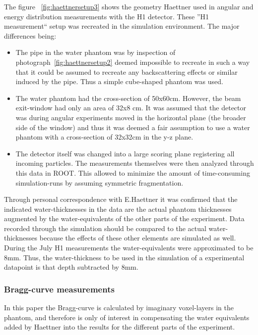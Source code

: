 The figure ~\ref{fig:haettnersetup3} shows the geometry Haettner used in angular and energy distribution measurements with the H1 detector. These ''H1 measurement`` setup was recreated in the simulation environment. The major differences being:
\begin{itemize}
\item The pipe in the water phantom was by inspection of photograph~\ref{fig:haettnersetup2} deemed impossible to recreate in such a way that it could be assumed to recreate any backscattering effects or similar induced by the pipe. Thus a simple cube-shaped phantom was used.
\item The water phantom had the cross-section of 50x60cm. However, the beam exit-window had only an area of 32x8 cm. It was assumed that the detector was during angular experiments moved in the horizontal plane (the broader side of the window) and thus it was deemed a fair assumption to use a water phantom with a cross-section of 32x32cm in the y-z plane. 
\item The detector itself was changed into a large scoring plane registering all incoming particles. The measurements themselves were then analyzed through this data in ROOT. This allowed to minimize the amount of time-consuming simulation-runs by assuming symmetric fragmentation.
\end{itemize}

Through personal correspondence with E.Haettner it was confirmed that the indicated water-thicknesses in the data are the actual phantom thicknesses augmented by the water-equivalents of the other parts of the experiment. Data recorded through the simulation should be compared to the actual water-thicknesses because the effects of these other elements are simulated as well. During the July H1 measurements the water-equivalents were approximated to be 8mm. Thus, the water-thickness to be used in the simulation of a experimental datapoint is that depth subtracted by 8mm. %

\subsubsection{Bragg-curve measurements}
In this paper the Bragg-curve is calculated by imaginary voxel-layers in the phantom, and therefore is only of interest in compensating the water equivalents added by Haettner into the results for the different parts of the experiment.

